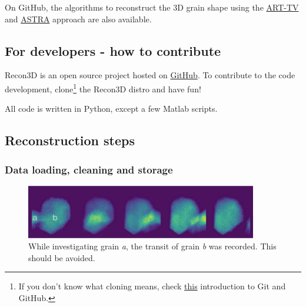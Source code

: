 \documentclass[11pt]{scrartcl}
\begin{document}
On GitHub, the algorithms to reconstruct the {\footnotesize{3D}} grain shape using the \href{https://github.com/albusdemens/ART-TV-for-DFXRM}{\footnotesize{ART-TV}} and \href{https://github.com/albusdemens/astrarecon}{\footnotesize{ASTRA}} approach are also available.

\subsection{For developers - how to contribute}

Recon3D is an open source project hosted on \href{https://github.com/albusdemens/Recon3D}{GitHub}. To contribute to the code development, clone\footnote{If you don't know what cloning means, check \href{http://product.hubspot.com/blog/git-and-github-tutorial-for-beginners}{this} introduction to Git and GitHub.} the Recon3D distro and have fun!

All code is written in Python, except a few Matlab scripts.

\subsection{Reconstruction steps}
\label{sec:rec_steps}

\subsubsection{Data loading, cleaning and storage}
\label{sec:load_clean_store}

\begin{figure}[h]
    \centering
    \includegraphics[width=0.9\textwidth]{grain_transit}
    \caption{While investigating grain {\emph{a}}, the transit of grain {\emph{b}} was recorded. This should be avoided.}
    \label{fig:grain_transit}
\end{figure}
\end{document}
